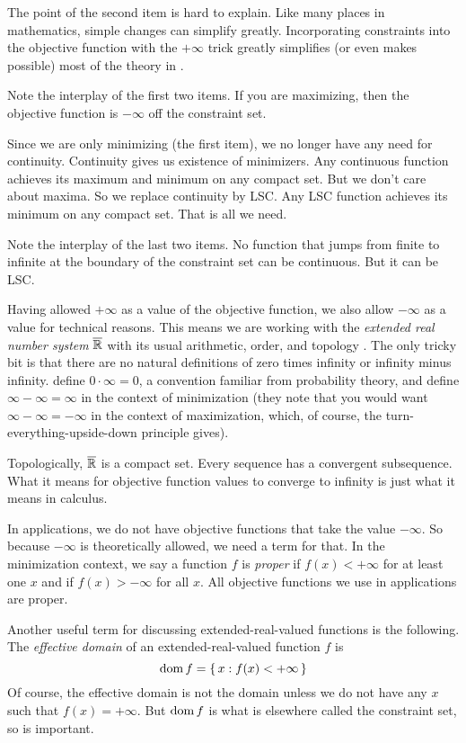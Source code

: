 The point of the second item is hard to explain.  Like many places
in mathematics, simple changes can simplify greatly.  Incorporating
constraints into the objective function with the $+\infty$ trick
greatly simplifies (or even makes
possible) most of the theory in \citet{rockafellar-wets}.

Note the interplay of the first two items.  If you are maximizing, then
the objective function is $-\infty$ off the constraint set.

Since we are only minimizing (the first item), we no longer have any need
for continuity.  Continuity gives us existence of minimizers.  Any continuous
function achieves its maximum and minimum on any compact set.  But we don't
care about maxima.  So we replace continuity by LSC.  Any LSC function
achieves its minimum on any compact set.  That is all we need.

Note the interplay of the last two items.  No function that jumps from finite
to infinite at the boundary of the constraint set can be continuous.
But it can be LSC.

Having allowed $+\infty$ as a value of the objective function, we also allow
$-\infty$ as a value for technical reasons.  This means we are working with
the \emph{extended real number system} $\overline{\mathbb{R}}$ with its usual arithmetic,
order, and
topology \citep[Section~1.E]{rockafellar-wets}.  The only tricky bit is that
there are no natural definitions of zero times infinity or infinity minus
infinity.  \citet{rockafellar-wets} define $0 \cdot \infty = 0$, a convention
familiar from probability theory, and define $\infty - \infty = \infty$ in
the context of minimization (they note that you would
want $\infty - \infty = - \infty$ in the context of maximization, which,
of course, the turn-everything-upside-down principle gives).

Topologically, $\overline{\mathbb{R}}$ is a compact
set.  Every sequence has a convergent subsequence.  What it means for
objective function values to converge to infinity is just what it means in
calculus.

In applications, we do not have objective functions that take the value
$-\infty$.  So because $-\infty$ is theoretically allowed, we need a term
for that.  In the minimization context, we say a function $f$ is \emph{proper}
if $f(x) < +\infty$ for at least one $x$ and
if $f(x) > -\infty$ for all $x$.
All objective functions we use in applications are proper.

Another useful term for discussing extended-real-valued functions
is the following.
The \emph{effective domain} of an extended-real-valued function $f$ is
$$
   \operatorname{dom} f = \{\,  x : f(x) < +\infty  \,\}
$$
Of course, the effective domain is not the domain unless we do not have
any $x$ such that $f(x) = +\infty$.  But $\operatorname{dom} f$ is what is elsewhere
called the constraint set, so is important.

